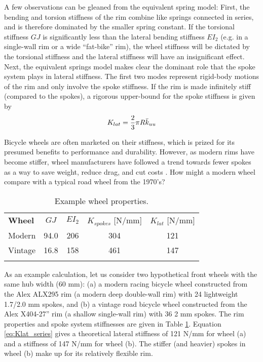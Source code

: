 \documentclass[\rootdir/thesis.tex]{subfiles}
\begin{document}
A few observations can be gleaned from the equivalent spring model: First, the bending and torsion stiffness of the rim combine like springs connected in series, and is therefore dominated by the smaller spring constant. If the torsional stiffness $GJ$ is significantly less than the lateral bending stiffness $EI_2$ (e.g. in a single-wall rim or a wide ``fat-bike'' rim), the wheel stiffness will be dictated by the torsional stiffness and the lateral stiffness will have an insignificant effect. Next, the equivalent springs model makes clear the dominant role that the spoke system plays in lateral stiffness. The first two modes represent rigid-body motions of the rim and only involve the spoke stiffness. If the rim is made infinitely stiff (compared to the spokes), a rigorous upper-bound for the spoke stiffness is given by
\begin{equation}
\label{eq:Klat_stiff_rim}
K_{lat} = \frac{2}{3} \pi R \bar{k}_{uu}
\end{equation}

Bicycle wheels are often marketed on their stiffness, which is prized for its presumed benefits to performance and durability. However, as modern rims have become stiffer, wheel manufacturers have followed a trend towards fewer spokes as a way to save weight, reduce drag, and cut costs \cite{Brown2011}. How might a modern wheel compare with a typical road wheel from the 1970's?

\begin{table}[h]
\caption{Example wheel properties.\label{tab:wheels}}
\begin{tabular}{@{}lcccc}
\hline\noalign{\smallskip}
\bf{Wheel} & $GJ$ & $EI_{2}$ & $K_{spokes}$ [N/mm] & $K_{lat}$ [N/mm]\\
\noalign{\smallskip}\hline\noalign{\smallskip}
Modern & 94.0 & 206 & 304 & 121\\
Vintage & 16.8 & 158 & 461 & 147\\
\noalign{\smallskip}\hline
\end{tabular}
\end{table}

As an example calculation, let us consider two hypothetical front wheels with the same hub width (60 mm): (a) a modern racing bicycle wheel constructed from the Alex ALX295 rim (a modern deep double-wall rim) with 24 lightweight 1.7/2.0 mm spokes, and (b) a vintage road bicycle wheel constructed from the Alex X404-27'' rim (a shallow single-wall rim) with 36 2 mm spokes. The rim properties and spoke system stiffnesses are given in Table \ref{tab:wheels}. Equation \eqref{eq:Klat_series} gives a theoretical lateral stiffness of 121 N/mm for wheel (a) and a stiffness of 147 N/mm for wheel (b). The stiffer (and heavier) spokes in wheel (b) make up for its relatively flexible rim.
\end{document}
